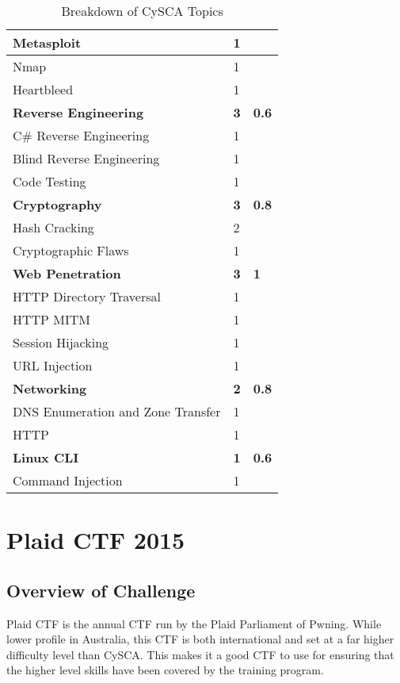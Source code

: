 \documentclass[a4paper,11pt]{report}
\begin{document}
\begin{table}[htb]
\begin{tabular}{| l | l | l |}
				\quad Metasploit & 1 & \\ \hline 
				\quad Nmap & 1 & \\ \hline 
				\quad Heartbleed & 1 & \\ \hline
				\textbf{Reverse Engineering} & \textbf{3} & \textbf{0.6}\\ \hline 
				\quad C\# Reverse Engineering & 1 & \\ \hline
				\quad Blind Reverse Engineering & 1 & \\ \hline 
				\quad Code Testing & 1 & \\ \hline 
				\textbf{Cryptography} & \textbf{3} & \textbf{0.8} \\ \hline 
				\quad Hash Cracking & 2 & \\ \hline
				\quad Cryptographic Flaws & 1 & \\ \hline 
				\textbf{Web Penetration} & \textbf{3} & \textbf{1} \\ \hline
				\quad HTTP Directory Traversal & 1 & \\ \hline
				\quad HTTP MITM & 1 & \\ \hline
				\quad Session Hijacking & 1 & \\ \hline
				\quad URL Injection & 1 & \\ \hline
				\textbf{Networking} & \textbf{2} & \textbf{0.8}\\ \hline
				\quad DNS Enumeration and Zone Transfer & 1 & \\ \hline 
				\quad HTTP & 1 & \\ \hline 
				\textbf{Linux CLI} & \textbf{1} &\textbf{0.6} \\ \hline
				\quad Command Injection & 1 & \\ \hline 
			\end{tabular}
			\caption{Breakdown of CySCA Topics}
			\label{tab:CySEC Breakdown}
		\end{table}

\chapter{Plaid CTF 2015}
	\section{Overview of Challenge}
		Plaid CTF is the annual CTF run by the Plaid Parliament of Pwning. 
		While lower profile in Australia, this CTF is both international and set at a far higher difficulty level than CySCA. 
		This makes it a good CTF to use for ensuring that the higher level skills have been covered by the training program. 
	
\end{document}
